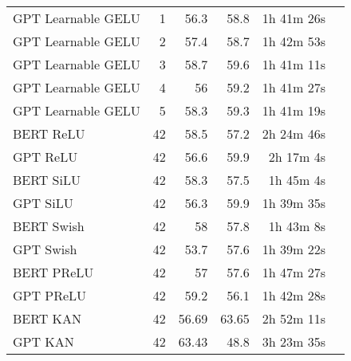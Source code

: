 \begin{table}[!htp]
\begin{tabular}{lrrrrr}
    GPT Learnable GELU &1 &56.3 &58.8 &1h 41m 26s \\
    GPT Learnable GELU &2 &57.4 &58.7 &1h 42m 53s \\
    GPT Learnable GELU &3 &58.7 &59.6 &1h 41m 11s \\
    GPT Learnable GELU &4 &56 &59.2 &1h 41m 27s \\
    GPT Learnable GELU &5 &58.3 &59.3 &1h 41m 19s \\
    BERT ReLU &42 &58.5 &57.2 &2h 24m 46s \\
    GPT ReLU &42 &56.6 &59.9 &2h 17m 4s \\
    BERT SiLU &42 &58.3 &57.5 &1h 45m 4s \\
    GPT SiLU &42 &56.3 &59.9 &1h 39m 35s \\
    BERT Swish &42 &58 &57.8 &1h 43m 8s \\
    GPT Swish &42 &53.7 &57.6 &1h 39m 22s \\
    BERT PReLU &42 &57 &57.6 &1h 47m 27s \\
    GPT PReLU &42 &59.2 &56.1 &1h 42m 28s \\
    BERT KAN &42 &56.69 &63.65 &2h 52m 11s \\
    GPT KAN &42 &63.43 &48.8 &3h 23m 35s \\
    \bottomrule
    \end{tabular}
    \end{table}

